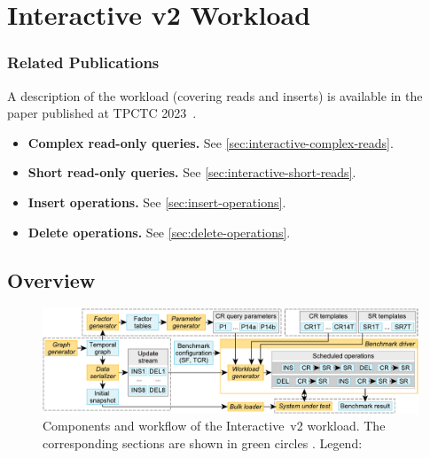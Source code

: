 \chapter{Interactive v2 Workload}
\label{sec:interactive-v2}

\subsection*{Related Publications}

A description of the workload (covering reads and inserts) is available in the paper published at TPCTC 2023~\cite{DBLP:journals/corr/abs-2307-04820}.

\begin{itemize}
    \item \textbf{Complex read-only queries.} See \autoref{sec:interactive-complex-reads}.
    \item \textbf{Short read-only queries.} See \autoref{sec:interactive-short-reads}.
    \item \textbf{Insert operations.} See \autoref{sec:insert-operations}.
    \item \textbf{Delete operations.} See \autoref{sec:delete-operations}.
\end{itemize}

\section{Overview}

\begin{figure}[htb]
    \centering
    \includegraphics[scale=\yedscale]{figures/interactive-v2-components}
    \caption{
        Components and workflow of the Interactive~v2 workload.
        The corresponding sections are shown in green circles \Circled{\textsf{\scriptsize \S}}.
        Legend:
    }
    \label{fig:interactive-components}
\end{figure}

